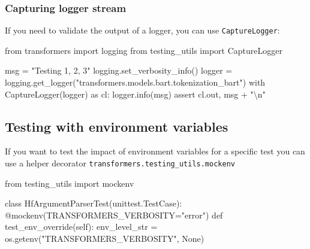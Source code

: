 \documentclass[
]{report}
\newenvironment{Shaded}{\begin{snugshade}}{\end{snugshade}}
\newcommand{\AttributeTok}[1]{\textcolor[rgb]{0.40,0.45,0.13}{#1}}
\newcommand{\CharTok}[1]{\textcolor[rgb]{0.13,0.47,0.30}{#1}}
\newcommand{\ControlFlowTok}[1]{\textcolor[rgb]{0.00,0.23,0.31}{#1}}
\newcommand{\ImportTok}[1]{\textcolor[rgb]{0.00,0.46,0.62}{#1}}
\newcommand{\KeywordTok}[1]{\textcolor[rgb]{0.00,0.23,0.31}{#1}}
\newcommand{\NormalTok}[1]{\textcolor[rgb]{0.00,0.23,0.31}{#1}}
\newcommand{\OperatorTok}[1]{\textcolor[rgb]{0.37,0.37,0.37}{#1}}
\newcommand{\StringTok}[1]{\textcolor[rgb]{0.13,0.47,0.30}{#1}}
\newcommand{\VariableTok}[1]{\textcolor[rgb]{0.07,0.07,0.07}{#1}}
\begin{document}
\subsubsection{Capturing logger stream}\label{capturing-logger-stream}

If you need to validate the output of a logger, you can use
\texttt{CaptureLogger}:

\begin{Shaded}
\begin{Highlighting}[]
\ImportTok{from}\NormalTok{ transformers }\ImportTok{import}\NormalTok{ logging}
\ImportTok{from}\NormalTok{ testing\_utils }\ImportTok{import}\NormalTok{ CaptureLogger}

\NormalTok{msg }\OperatorTok{=} \StringTok{"Testing 1, 2, 3"}
\NormalTok{logging.set\_verbosity\_info()}
\NormalTok{logger }\OperatorTok{=}\NormalTok{ logging.get\_logger(}\StringTok{"transformers.models.bart.tokenization\_bart"}\NormalTok{)}
\ControlFlowTok{with}\NormalTok{ CaptureLogger(logger) }\ImportTok{as}\NormalTok{ cl:}
\NormalTok{    logger.info(msg)}
\ControlFlowTok{assert}\NormalTok{ cl.out, msg }\OperatorTok{+} \StringTok{"}\CharTok{\textbackslash{}n}\StringTok{"}
\end{Highlighting}
\end{Shaded}

\subsection{Testing with environment
variables}\label{testing-with-environment-variables}

If you want to test the impact of environment variables for a specific
test you can use a helper decorator
\texttt{transformers.testing\_utils.mockenv}

\begin{Shaded}
\begin{Highlighting}[]
\ImportTok{from}\NormalTok{ testing\_utils }\ImportTok{import}\NormalTok{ mockenv}


\KeywordTok{class}\NormalTok{ HfArgumentParserTest(unittest.TestCase):}
    \AttributeTok{@mockenv}\NormalTok{(TRANSFORMERS\_VERBOSITY}\OperatorTok{=}\StringTok{"error"}\NormalTok{)}
    \KeywordTok{def}\NormalTok{ test\_env\_override(}\VariableTok{self}\NormalTok{):}
\NormalTok{        env\_level\_str }\OperatorTok{=}\NormalTok{ os.getenv(}\StringTok{"TRANSFORMERS\_VERBOSITY"}\NormalTok{, }\VariableTok{None}\NormalTok{)}
\end{Highlighting}
\end{Shaded}
\end{document}

